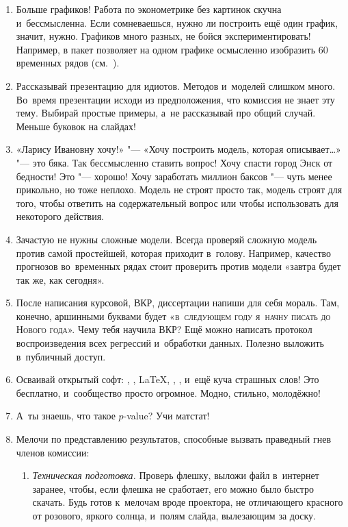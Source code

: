 \documentclass[final,pdftex]{../../template/epsilonj}
\begin{document}
\begin{enumerate}
	\item Больше графиков! Работа по эконометрике без картинок скучна и~бессмысленна. Если сомневаешься, нужно ли построить ещё один график, значит, нужно. Графиков много разных, не бойся экспериментировать! Например, в  пакет  позволяет на одном графике  осмысленно изобразить 60 временных рядов (см.~\cite{mvtsplot}). 
	\item Рассказывай презентацию для идиотов. Методов и~моделей слишком много. Во~время презентации исходи из предположения, что комиссия не знает эту тему. Выбирай простые примеры, а~не рассказывай про общий случай. Меньше буковок на слайдах! 
	\item «Ларису Ивановну хочу!» "--- «Хочу построить модель, которая описывает\ldots» "--- это бяка. Так бессмысленно ставить вопрос! Хочу спасти город Энск от бедности! Это "--- хорошо! Хочу заработать миллион баксов "--- чуть менее прикольно, но тоже неплохо. Модель не строят просто так, модель строят для того, чтобы ответить на содержательный вопрос или чтобы использовать для некоторого действия.
	\item Зачастую не нужны сложные модели. Всегда проверяй сложную модель против самой простейшей, которая приходит в~голову. Например, качество прогнозов во~временных рядах стоит проверить против модели «завтра будет так же, как сегодня». 
	\item После написания курсовой, ВКР, диссертации напиши для себя мораль. Там, конечно, аршинными буквами будет «\textsc{в~следующем году я~начну писать до Нового года}». Чему тебя научила ВКР? Ещё можно написать протокол воспроизведения всех регрессий и~обработки данных. Полезно выложить в~публичный доступ. 
	\item Осваивай открытый софт: , , \LaTeX, , ,  и~ещё куча страшных слов! Это бесплатно, и~сообщество просто огромное. Модно, стильно, молодёжно! 
	\item А~ты знаешь, что такое $p$-value? Учи матстат! 
	\item Мелочи по представлению результатов, способные вызвать праведный гнев членов комиссии:
	\begin{enumerate}
		\item \textit{Техническая подготовка.} Проверь флешку, выложи файл в~интернет заранее, чтобы, если флешка не сработает, его можно было быстро скачать. Будь готов к~мелочам вроде проектора, не отличающего красного от розового, яркого солнца, и~полям слайда, вылезающим за доску. 

\end{enumerate}
\end{enumerate}
\end{document}
